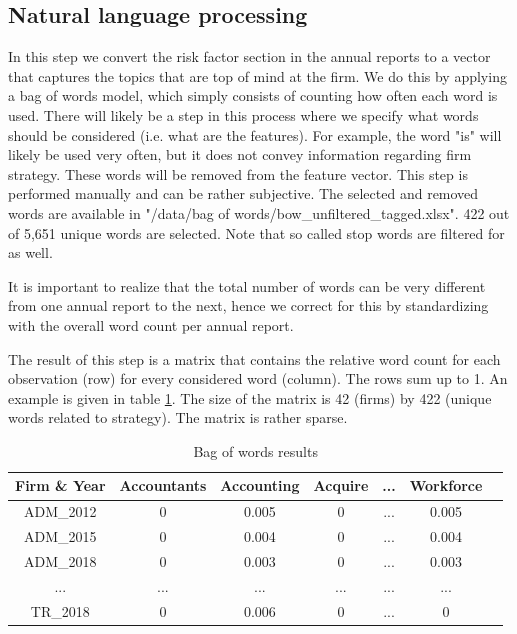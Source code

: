 \documentclass{article}
\begin{document}
\subsection{Natural language processing}
In this step we convert the risk factor section in the annual reports to a vector that captures the topics that are top of mind at the firm. We do this by applying a bag of words model, which simply consists of counting how often each word is used. There will likely be a step in this process where we specify what words should be considered (i.e. what are the features). For example, the word "is" will likely be used very often, but it does not convey information regarding firm strategy. These words will be removed from the feature vector. This step is performed manually and can be rather subjective. The selected and removed words are available in "/data/bag of words/bow\_unfiltered\_tagged.xlsx". 422 out of 5,651 unique words are selected. Note that so called stop words are filtered for as well. 

It is important to realize that the total number of words can be very different from one annual report to the next, hence we correct for this by standardizing with the overall word count per annual report.

The result of this step is a matrix that contains the relative word count for each observation (row) for every considered word (column). The rows sum up to 1. An example is given in table \ref{tab:bow}. The size of the matrix is 42 (firms) by 422 (unique words related to strategy). The matrix is rather sparse.

\begin{table}[h]
    \centering
    \begin{tabular}{c|c|c|c|c|c|c}
        \textbf{Firm \& Year} & \textbf{Accountants} & \textbf{Accounting} & \textbf{Acquire} & \textbf{...} & \textbf{Workforce} \\
        \hline
        ADM\_2012 & 0 & 0.005 & 0 & ... & 0.005 \\
        ADM\_2015 & 0 & 0.004 & 0 & ... & 0.004 \\
        ADM\_2018 & 0 & 0.003 & 0 & ... & 0.003 \\
        ... & ... & ... & ... & ... & ... \\
        TR\_2018 & 0 & 0.006 & 0 & ... & 0 \\
    \end{tabular}
    \caption{Bag of words results}
    \label{tab:bow}
\end{table}
\end{document}
